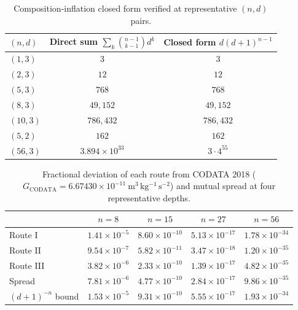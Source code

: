 \documentclass[11pt,twocolumn,a4paper]{article}
\theoremstyle{axiomstyle}
\theoremstyle{conseqstyle}
\theoremstyle{definition}
\theoremstyle{remark}
\begin{document}
\begin{table}[H]
\centering\small
\caption{Composition-inflation closed form verified at representative $(n,d)$ pairs.}
\label{tab:compositionspotcheck}
\begin{tabular}{lcc}
\toprule
$(n,d)$ & Direct sum $\sum_{k}\binom{n-1}{k-1}d^{k}$ & Closed form $d(d+1)^{n-1}$\\
\midrule
$(1,3)$  & $3$ & $3$\\
$(2,3)$  & $12$ & $12$\\
$(5,3)$  & $768$ & $768$\\
$(8,3)$  & $49{,}152$ & $49{,}152$\\
$(10,3)$ & $786{,}432$ & $786{,}432$\\
$(5,2)$  & $162$ & $162$\\
$(56,3)$ & $3.894\times10^{33}$ & $3\cdot 4^{55}$\\
\bottomrule
\end{tabular}
\end{table}

\begin{table}[H]
\centering\small
\caption{Fractional deviation of each route from CODATA 2018 ($G_{\mathrm{CODATA}}=6.67430\times10^{-11}~\mathrm{m^{3}\,kg^{-1}\,s^{-2}}$) and mutual spread at four representative depths.}
\label{tab:routedeviation}
\begin{tabular}{lcccc}
\toprule
 & $n=8$ & $n=15$ & $n=27$ & $n=56$\\
\midrule
Route I   & $1.41\times10^{-5}$  & $8.60\times10^{-10}$ & $5.13\times10^{-17}$ & $1.78\times10^{-34}$\\
Route II  & $9.54\times10^{-7}$  & $5.82\times10^{-11}$ & $3.47\times10^{-18}$ & $1.20\times10^{-35}$\\
Route III & $3.82\times10^{-6}$  & $2.33\times10^{-10}$ & $1.39\times10^{-17}$ & $4.82\times10^{-35}$\\
\midrule
Spread    & $7.81\times10^{-6}$  & $4.77\times10^{-10}$ & $2.84\times10^{-17}$ & $9.86\times10^{-35}$\\
$(d{+}1)^{-n}$ bound & $1.53\times10^{-5}$  & $9.31\times10^{-10}$ & $5.55\times10^{-17}$ & $1.93\times10^{-34}$\\
\bottomrule
\end{tabular}
\end{table}
\end{document}
